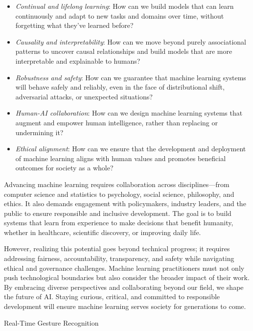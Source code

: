\documentclass[
  9pt,
  letterpaper,
  abstract,
  titlepage]{scrbook}
\makeatletter
\renewcommand\chapter{\clearpage\global\@topnum\z@
\@afterindentfalse \secdef\@chapter\@schapter}
\newif\if@firstnumbered%
\newif\if@firstunnumbered%
\newcounter{lastRomanPage}
\let\old@chapter\chapter%
\renewcommand{\chapter}{%
  \@ifstar{\unnumbered@chapter}{\numbered@chapter}%
}
\newcommand{\numbered@chapter}[1]{%
  \if@firstnumbered%
    \cleardoublepage%
    \setcounter{lastRomanPage}{\value{page}}%
    \pagenumbering{arabic}%
    \@firstnumberedfalse%
  \else
    \setcounter{page}{\value{page}}%
  \fi
  \old@chapter{#1}%
}
\newcommand{\unnumbered@chapter}[1]{%
  \if@firstunnumbered%
    \clearpage
    \setcounter{lastRomanPage}{\value{page}}%
    \pagenumbering{roman}%
    \@firstunnumberedfalse%
  \fi
  \old@chapter*{#1}%
}
\makeatother
\begin{document}
\begin{itemize}
\item
  \emph{Continual and lifelong learning}: How can we build models that
  can learn continuously and adapt to new tasks and domains over time,
  without forgetting what they've learned before?
\item
  \emph{Causality and interpretability}: How can we move beyond purely
  associational patterns to uncover causal relationships and build
  models that are more interpretable and explainable to humans?
\item
  \emph{Robustness and safety}: How can we guarantee that machine
  learning systems will behave safely and reliably, even in the face of
  distributional shift, adversarial attacks, or unexpected situations?
\item
  \emph{Human-AI collaboration}: How can we design machine learning
  systems that augment and empower human intelligence, rather than
  replacing or undermining it?
\item
  \emph{Ethical alignment}: How can we ensure that the development and
  deployment of machine learning aligns with human values and promotes
  beneficial outcomes for society as a whole?
\end{itemize}

Advancing machine learning requires collaboration across
disciplines---from computer science and statistics to psychology, social
science, philosophy, and ethics. It also demands engagement with
policymakers, industry leaders, and the public to ensure responsible and
inclusive development. The goal is to build systems that learn from
experience to make decisions that benefit humanity, whether in
healthcare, scientific discovery, or improving daily life.

However, realizing this potential goes beyond technical progress; it
requires addressing fairness, accountability, transparency, and safety
while navigating ethical and governance challenges. Machine learning
practitioners must not only push technological boundaries but also
consider the broader impact of their work. By embracing diverse
perspectives and collaborating beyond our field, we shape the future of
AI. Staying curious, critical, and committed to responsible development
will ensure machine learning serves society for generations to come.

\chapter{Real-Time Gesture
Recognition}\label{real-time-gesture-recognition}
\end{document}
